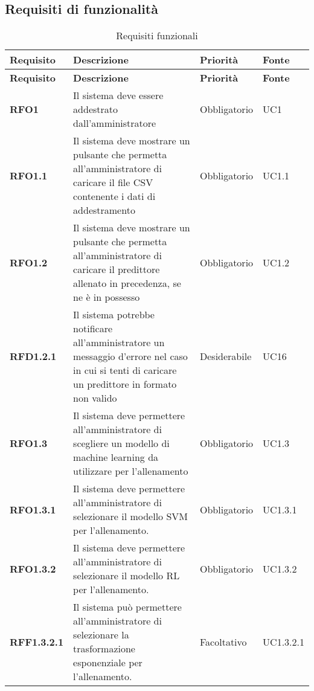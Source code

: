 \subsection{Requisiti di funzionalità}
\label{sub:requisiti_di_funzionalita}

\renewcommand{\arraystretch}{2} %
\begin{longtable}[H]{>{\centering\bfseries}m{2cm} >{\centering}m{9cm} >{\centering}m{2.5cm} >{\centering\arraybackslash}m{2.5cm}}
  \caption{Requisiti funzionali}%
  \label{tab:requisiti_funzionali}                                                    \\
  \rowcolor{lightgray}
  {\textbf{Requisito}} & {\textbf{Descrizione}} & {\textbf{Priorità}} & {\textbf{Fonte}}  \\
  \endfirsthead%
  \rowcolor{lightgray}
  {\textbf{Requisito}} & {\textbf{Descrizione}} & {\textbf{Priorità}} & {\textbf{Fonte}}  \\
  \endhead%
  \rowcolor{white}
  \multicolumn{4}{c}{\textit{Continua alla pagina successiva}}
  \endfoot%
  \endlastfoot%
  \textbf{RFO1} & Il sistema deve essere addestrato dall'amministratore & Obbligatorio & UC1 \\
  \textbf{RFO1.1} & Il sistema deve mostrare un pulsante che permetta all'amministratore di caricare il file CSV contenente i dati di addestramento  & Obbligatorio & UC1.1 \\
  \textbf{RFO1.2} & Il sistema deve mostrare un pulsante che permetta all'amministratore di caricare il predittore allenato in precedenza, se ne è in possesso & Obbligatorio & UC1.2 \\
  \textbf{RFD1.2.1} & Il sistema potrebbe notificare all'amministratore un messaggio d'errore nel caso in cui si tenti di caricare un predittore in formato non valido & Desiderabile & UC16 \\
  \textbf{RFO1.3} & Il sistema deve permettere all'amministratore di scegliere un modello di machine learning da utilizzare per l'allenamento & Obbligatorio & UC1.3 \\
  \textbf{RFO1.3.1} & Il sistema deve permettere all'amministratore di selezionare il modello SVM per l'allenamento. & Obbligatorio & UC1.3.1 \\
  \textbf{RFO1.3.2} & Il sistema deve permettere all'amministratore di selezionare il modello RL per l'allenamento. & Obbligatorio & UC1.3.2 \\
  \textbf{RFF1.3.2.1} & Il sistema può permettere all'amministratore di selezionare la trasformazione esponenziale per l'allenamento. & Facoltativo & UC1.3.2.1 \\

\end{longtable}
